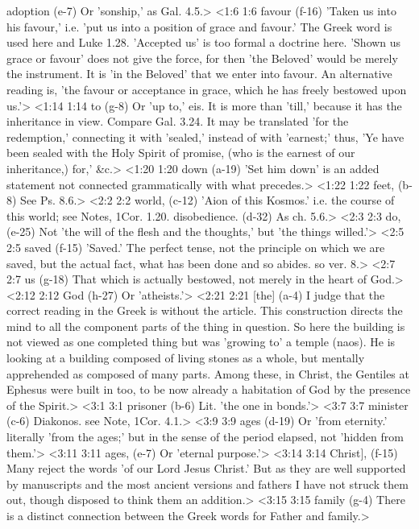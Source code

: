   adoption (e-7)  Or 'sonship,' as Gal. 4.5.>
<1:6 1:6  favour (f-16)  'Taken us into his favour,' i.e. 'put us into a position of  grace and favour.' The Greek word is used here and Luke 1.28.  'Accepted us' is too formal a doctrine here. 'Shown us grace or  favour' does not give the force, for then 'the Beloved' would  be merely the instrument. It is 'in the Beloved' that we enter  into favour. An alternative reading is, 'the favour or  acceptance in grace, which he has freely bestowed upon us.'>
<1:14 1:14  to (g-8)  Or 'up to,' eis. It is more than 'till,' because it has the  inheritance in view. Compare Gal. 3.24. It may be translated  'for the redemption,' connecting it with 'sealed,' instead of  with 'earnest;' thus, 'Ye have been sealed with the Holy Spirit  of promise, (who is the earnest of our inheritance,) for,' &c.>
<1:20 1:20  down (a-19)  'Set him down' is an added statement not connected  grammatically with what precedes.>
<1:22 1:22  feet, (b-8)  See Ps. 8.6.>
<2:2 2:2  world, (c-12)  'Aion of this Kosmos.' i.e. the course of this world; see  Notes, 1Cor. 1.20.
  disobedience. (d-32)  As ch. 5.6.>
<2:3 2:3  do, (e-25)  Not 'the will of the flesh and the thoughts,' but 'the things  willed.'>
<2:5 2:5  saved (f-15)  'Saved.' The perfect tense, not the principle on which we are  saved, but the actual fact, what has been done and so abides.  so ver. 8.>
<2:7 2:7  us (g-18)  That which is actually bestowed, not merely in the heart of  God.>
<2:12 2:12  God (h-27)  Or 'atheists.'>
<2:21 2:21  [the] (a-4)  I judge that the correct reading in the Greek is without the  article. This construction directs the mind to all the  component parts of the thing in question. So here the building  is not viewed as one completed thing but was 'growing to' a  temple (naos). He is looking at a building composed of living  stones as a whole, but mentally apprehended as composed of many  parts. Among these, in Christ, the Gentiles at Ephesus were  built in too, to be now already a habitation of God by the  presence of the Spirit.>
<3:1 3:1  prisoner (b-6)  Lit. 'the one in bonds.'>
<3:7 3:7  minister (c-6)  Diakonos. see Note, 1Cor. 4.1.>
<3:9 3:9  ages (d-19)  Or 'from eternity.' literally 'from the ages;' but in the  sense of the period elapsed, not 'hidden from them.'>
<3:11 3:11  ages, (e-7)  Or 'eternal purpose.'>
<3:14 3:14  Christ], (f-15)  Many reject the words 'of our Lord Jesus Christ.' But as they  are well supported by manuscripts and the most ancient versions  and fathers I have not struck them out, though disposed to  think them an addition.>
<3:15 3:15  family (g-4)  There is a distinct connection between the Greek words for  Father and family.>
